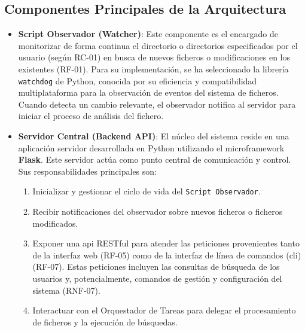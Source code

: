 \subsection{Componentes Principales de la Arquitectura}

\begin{itemize}
    \item \textbf{Script Observador (Watcher)}:
    Este componente es el encargado de monitorizar de forma continua el directorio o directorios especificados por el usuario (según RC-01) en busca de nuevos ficheros o modificaciones en los existentes (RF-01). Para su implementación, se ha seleccionado la librería \texttt{watchdog} de Python, conocida por su eficiencia y compatibilidad multiplataforma para la observación de eventos del sistema de ficheros. Cuando detecta un cambio relevante, el observador notifica al servidor para iniciar el proceso de análisis del fichero.

    \item \textbf{Servidor Central (Backend API)}:
    El núcleo del sistema reside en una aplicación servidor desarrollada en Python utilizando el microframework \textbf{Flask}. Este servidor actúa como punto central de comunicación y control. Sus responsabilidades principales son:
    \begin{enumerate}
        \item Inicializar y gestionar el ciclo de vida del \texttt{Script Observador}.
        \item Recibir notificaciones del observador sobre nuevos ficheros o ficheros modificados.
        \item Exponer una \gls{api} RESTful para atender las peticiones provenientes tanto de la interfaz web (RF-05) como de la interfaz de línea de comandos (\gls{cli}) (RF-07). Estas peticiones incluyen las consultas de búsqueda de los usuarios y, potencialmente, comandos de gestión y configuración del sistema (RNF-07).
        \item Interactuar con el Orquestador de Tareas para delegar el procesamiento de ficheros y la ejecución de búsquedas.
    \end{enumerate}


\end{itemize}
